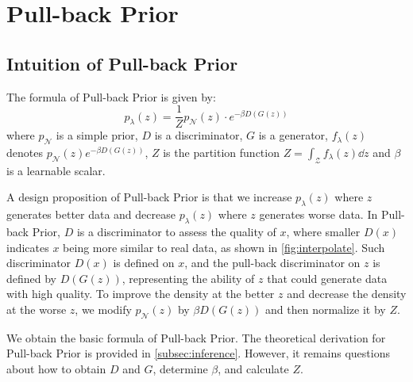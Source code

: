 
\section{Pull-back Prior}\label{sec:pull_back_prior}

\subsection{Intuition of Pull-back Prior}\label{subsec:intuition}

The formula of Pull-back Prior is given by:
\begin{equation}\label{eq:pull_back_prior}
	p_\lambda(z) = \frac{1}{Z} p_\mathcal{N}(z) \cdot e^{- \beta D(G(z))} \tag{4}
\end{equation}
where $p_\mathcal{N}$ is a simple prior, $D$ is a discriminator, $G$ is a generator, $f_\lambda(z)$ denotes $p_\mathcal{N}(z) e^{- \beta D(G(z))}$, $Z$ is the partition function $Z = \int_{\mathcal{Z}} f_\lambda(z) \dd z$ and $\beta$ is a learnable scalar.

A design proposition of Pull-back Prior is that we increase $p_\lambda(z)$ where $z$ generates better data and decrease $p_\lambda(z)$ where $z$ generates worse data. In Pull-back Prior, 
$D$ is a discriminator to assess the quality of $x$, where smaller $D(x)$ indicates $x$ being more similar to real data, as shown in \cref{fig:interpolate}. Such discriminator $D(x)$ is defined on $x$, and the pull-back discriminator on $z$ is defined by $D(G(z))$, representing the ability of $z$ that could generate data with high quality. To improve the density at the better $z$ and decrease the density at the worse $z$, we modify $p_\mathcal{N}(z)$ by $\beta D(G(z))$ and then normalize it by $Z$. 

We obtain the basic formula of Pull-back Prior. The theoretical derivation for Pull-back Prior is provided in \cref{subsec:inference}. However, it remains questions about how to obtain $D$ and $G$, determine $\beta$, and calculate $Z$. 

